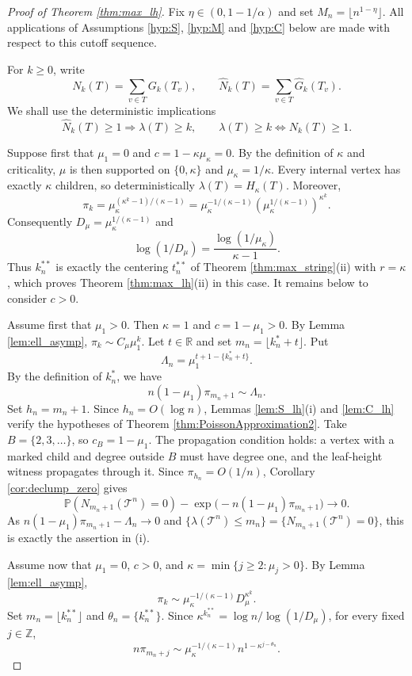 \documentclass[a4paper,11pt]{article}
\DeclareRobustCommand{\P}{\mathbb{P}}
\DeclareRobustCommand{\1}{\mathbf{1}}
\begin{document}
\begin{proof}[Proof of Theorem \ref{thm:max_lh}]
Fix $\eta\in(0,1-1/\alpha)$ and set
$M_n=\lfloor n^{1-\eta}\rfloor$. All applications of Assumptions
\ref{hyp:S}, \ref{hyp:M} and \ref{hyp:C} below are made with respect to
this cutoff sequence.

  For $k\ge0$, write
  $$
    N_k(T)=\sum_{v\in T}G_k(T_v),
    \qquad
    \widehat N_k(T)=\sum_{v\in T}\widehat{G}_k(T_v).
  $$
  We shall use the deterministic implications
  $$
    \widehat N_k(T)\ge1\Rightarrow \lambda(T)\ge k,
    \qquad
    \lambda(T)\ge k\Leftrightarrow N_k(T)\ge1.
  $$

Suppose first that $\mu_1=0$ and $c=1-\kappa\mu_\kappa=0$. By the
definition of $\kappa$ and criticality, $\mu$ is then supported on
$\{0,\kappa\}$ and $\mu_\kappa=1/\kappa$. Every internal vertex has exactly
$\kappa$ children, so deterministically
$
\lambda(T)=H_\kappa(T)$.
Moreover,
$$
\pi_k=\mu_\kappa^{(\kappa^k-1)/(\kappa-1)}
=\mu_\kappa^{-1/(\kappa-1)}
\left(\mu_\kappa^{1/(\kappa-1)}\right)^{\kappa^k}.
$$
Consequently
$D_\mu=\mu_\kappa^{1/(\kappa-1)}$ and
$$
\log(1/D_\mu)=\frac{\log(1/\mu_\kappa)}{\kappa-1}.
$$
Thus $k_n^{**}$ is exactly the centering $t_n^{**}$ of Theorem
\ref{thm:max_string}\textup{(ii)} with $r=\kappa$, which proves
Theorem \ref{thm:max_lh}\textup{(ii)} in this case. It remains below to
consider $c>0$.

  Assume first that $\mu_1>0$. Then $\kappa=1$ and $c=1-\mu_1>0$. By Lemma
  \ref{lem:ell_asymp}, $\pi_k\sim C_\mu\mu_1^k$. Let $t\in\mathbb R$ and set
  $m_n=\lfloor k_n^*+t\rfloor$. Put
  $$
    \Lambda_n=\mu_1^{t+1-\{k_n^*+t\}}.
  $$
  By the definition of $k_n^*$, we have
  $$
    n(1-\mu_1)\pi_{m_n+1}\sim \Lambda_n.
  $$
Set $h_n=m_n+1$. Since $h_n=O(\log n)$, Lemmas
\ref{lem:S_lh}\textup{(i)} and \ref{lem:C_lh} verify the hypotheses of
Theorem \ref{thm:PoissonApproximation2}. Take
$B=\{2,3,\ldots\}$, so $c_B=1-\mu_1$. The propagation condition holds:
a vertex with a marked child and degree outside $B$ must have degree one,
and the leaf-height witness propagates through it. Since
$\pi_{h_n}=O(1/n)$, Corollary \ref{cor:declump_zero} gives
$$
\P(N_{m_n+1}(\mathcal T^n)=0)
-\exp\bigl(-n(1-\mu_1)\pi_{m_n+1}\bigr)\longrightarrow0.
$$
As $n(1-\mu_1)\pi_{m_n+1}-\Lambda_n\to0$ and
$\{\lambda(\mathcal T^n)\le m_n\}=\{N_{m_n+1}(\mathcal T^n)=0\}$, this is
exactly the assertion in \textup{(i)}.

Assume now that $\mu_1=0$, $c>0$, and
$\kappa=\min\{j\ge2:\mu_j>0\}$.
By Lemma
  \ref{lem:ell_asymp},
  $$
    \pi_k\sim \mu_\kappa^{-1/(\kappa-1)}D_\mu^{\kappa^k}.
  $$
  Set $m_n=\lfloor k_n^{**}\rfloor$ and $\theta_n=\{k_n^{**}\}$. Since
  $\kappa^{k_n^{**}}=\log n/\log(1/D_\mu)$, for every fixed
  $j\in\mathbb Z$,
  $$
    n\pi_{m_n+j}
    \sim
    \mu_\kappa^{-1/(\kappa-1)}
    n^{1-\kappa^{j-\theta_n}}.
  $$
  

\end{proof}
\end{document}
